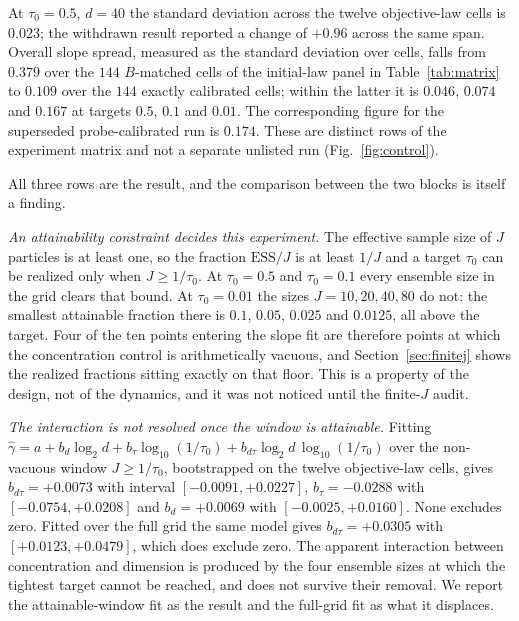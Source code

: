 \documentclass[pdflatex,sn-mathphys-num]{sn-jnl}
\theoremstyle{thmstyleone}
\theoremstyle{thmstyletwo}
\theoremstyle{thmstylethree}
\begin{document}
At $\tau_0=0.5$, $d=40$ the standard deviation across the twelve objective-law cells is $0.023$; the withdrawn result reported a change of $+0.96$ across the same span. Overall slope spread, measured as the standard deviation over cells, falls from $0.379$ over the $144$ $B$-matched cells of the initial-law panel in Table~\ref{tab:matrix} to $0.109$ over the $144$ exactly calibrated cells; within the latter it is $0.046$, $0.074$ and $0.167$ at targets $0.5$, $0.1$ and $0.01$. The corresponding figure for the superseded probe-calibrated run is $0.174$. These are distinct rows of the experiment matrix and not a separate unlisted run (Fig.~\ref{fig:control}).

All three rows are the result, and the comparison between the two blocks is itself a finding.

\emph{An attainability constraint decides this experiment.} The effective sample size of $J$ particles is at least one, so the fraction $\mathrm{ESS}/J$ is at least $1/J$ and a target $\tau_0$ can be realized only when $J\ge1/\tau_0$. At $\tau_0=0.5$ and $\tau_0=0.1$ every ensemble size in the grid clears that bound. At $\tau_0=0.01$ the sizes $J=10,20,40,80$ do not: the smallest attainable fraction there is $0.1$, $0.05$, $0.025$ and $0.0125$, all above the target. Four of the ten points entering the slope fit are therefore points at which the concentration control is arithmetically vacuous, and Section~\ref{sec:finitej} shows the realized fractions sitting exactly on that floor. This is a property of the design, not of the dynamics, and it was not noticed until the finite-$J$ audit.

\emph{The interaction is not resolved once the window is attainable.} Fitting $\hat\gamma=a+b_d\log_2 d+b_\tau\log_{10}(1/\tau_0)+b_{d\tau}\log_2 d\,\log_{10}(1/\tau_0)$ over the non-vacuous window $J\ge1/\tau_0$, bootstrapped on the twelve objective-law cells, gives $b_{d\tau}=+0.0073$ with interval $[-0.0091,+0.0227]$, $b_\tau=-0.0288$ with $[-0.0754,+0.0208]$ and $b_d=+0.0069$ with $[-0.0025,+0.0160]$. None excludes zero. Fitted over the full grid the same model gives $b_{d\tau}=+0.0305$ with $[+0.0123,+0.0479]$, which does exclude zero. The apparent interaction between concentration and dimension is produced by the four ensemble sizes at which the tightest target cannot be reached, and does not survive their removal. We report the attainable-window fit as the result and the full-grid fit as what it displaces.
\end{document}
